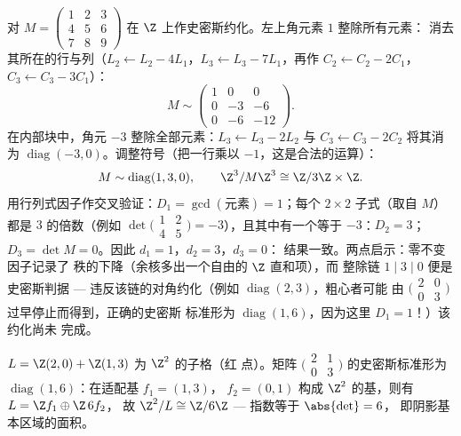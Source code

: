 \begin{example}[史密斯约化的完整实例]
\label{ex:b3:modules:smithworked}
对 $M = \begin{pmatrix} 1 & 2 & 3\\ 4 & 5 & 6\\ 7 & 8 & 9
\end{pmatrix}$ 在 $\Z$ 上作史密斯约化。左上角元素 $1$ 整除所有元素：
消去其所在的行与列（$L_2 \leftarrow L_2 - 4L_1$，$L_3
\leftarrow L_3 - 7L_1$，再作 $C_2 \leftarrow C_2 - 2C_1$，$C_3
\leftarrow C_3 - 3C_1$）：
\[
M \sim \begin{pmatrix} 1 & 0 & 0\\ 0 & -3 & -6\\ 0 & -6 & -12
\end{pmatrix} .
\]
在内部块中，角元 $-3$ 整除全部元素：$L_3
\leftarrow L_3 - 2L_2$ 与 $C_3 \leftarrow C_3 - 2C_2$ 将其消为
$\operatorname{diag}(-3, 0)$。调整符号（把一行乘以
$-1$，这是合法的运算）：
\[
M \sim \operatorname{diag}(1, 3, 0),
\qquad
\Z^3/M\Z^3 \cong \Z/3\Z \times \Z .
\]
用行列式因子作交叉验证：$D_1 =
\gcd(\text{元素}) = 1$；每个 $2\times2$ 子式（取自 $M$）都是
$3$ 的倍数（例如 $\det\bigl(\begin{smallmatrix}1 & 2\\ 4
& 5\end{smallmatrix}\bigr) = -3$），且其中有一个等于 $-3$：$D_2 =
3$；$D_3 = \det M = 0$。因此 $d_1 = 1$，$d_2 = 3$，$d_3 = 0$：
结果一致。两点启示：零不变因子记录了
秩的下降（余核多出一个自由的 $\Z$ 直和项），而
整除链 $1 \mid 3 \mid 0$ 便是史密斯判据
--- 违反该链的对角约化（例如
$\operatorname{diag}(2, 3)$，粗心者可能
由 $\bigl(\begin{smallmatrix}2 & 0\\ 0 &
3\end{smallmatrix}\bigr)$ 过早停止而得到，正确的史密斯
标准形为 $\operatorname{diag}(1, 6)$，因为这里 $D_1 = 1$！）该约化尚未
完成。
\end{example}

\begin{omfigure}

{\small $L = \Z(2,0) + \Z(1,3)$ 为 $\Z^2$ 的子格（红
点）。矩阵 $\bigl(\begin{smallmatrix} 2 &
1\\ 0 & 3\end{smallmatrix}\bigr)$ 的史密斯标准形为
$\operatorname{diag}(1, 6)$：在适配基 $f_1 = (1,3)$，
$f_2 = (0,1)$ 构成 $\Z^2$ 的基，则有 $L = \Z f_1 \oplus \Z\,6f_2$，
故 $\Z^2/L \cong \Z/6\Z$ --- 指数等于 $\abs{\det} = 6$，
即阴影基本区域的面积。}
\end{omfigure}

